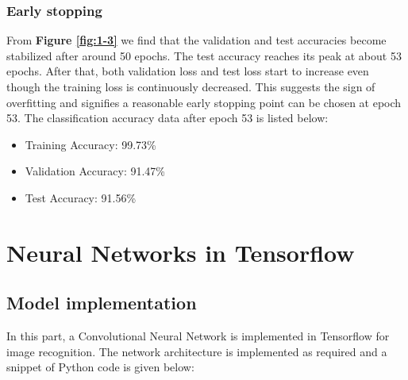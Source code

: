\documentclass[12pt]{article}
\begin{document}
\bigskip
\subsubsection{Early stopping}

From \textbf{Figure \ref{fig:1-3}} we find that the validation and test accuracies become stabilized after around 50 epochs. The test accuracy reaches its peak at about 53 epochs. After that, both validation loss and test loss start to increase even though the training loss is continuously decreased. This suggests the sign of overfitting and signifies a reasonable early stopping point can be chosen at epoch 53. The classification accuracy data after epoch 53 is listed below:

\begin{itemize}
    \item Training Accuracy: 99.73\%
    \item Validation Accuracy: 91.47\%
    \item Test Accuracy: 91.56\%
\end{itemize}
\bigskip
\section{Neural Networks in Tensorflow}

\subsection{Model implementation}
In this part, a Convolutional Neural Network is implemented in Tensorflow for image recognition. The network architecture is implemented as required and a snippet of Python code is given below:   
\end{document}
